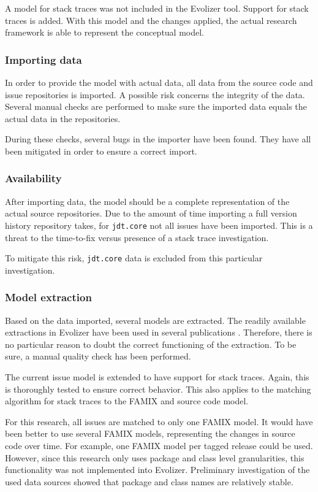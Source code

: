A model for stack traces was not included in the Evolizer tool. Support for stack traces is added. With this model and the changes applied, the actual research framework is able to represent the conceptual model.

\subsubsection{Importing data} %
In order to provide the model with actual data, all data from the source code and issue repositories is imported. A possible risk concerns the integrity of the data. Several manual checks are performed to make sure the imported data equals the actual data in the repositories.

During these checks, several bugs in the importer have been found. They have all been mitigated in order to ensure a correct import. 

\subsubsection{Availability} %
After importing data, the model should be a complete representation of the actual source repositories. Due to the amount of time importing a full version history repository takes, for \texttt{jdt.core} not all issues have been imported. This is a threat to the time-to-fix versus presence of a stack trace investigation. 

To mitigate this risk, \texttt{jdt.core} data is excluded from this particular investigation.

\subsubsection{Model extraction} %
Based on the data imported, several models are extracted. The readily available extractions in Evolizer have been used in several publications \cite{Gall2009,Ghezzi2008,Ghezzi2010}. Therefore, there is no particular reason to doubt the correct functioning of the extraction. To be sure, a manual quality check has been performed.

The current issue model is extended to have support for stack traces. Again, this is thoroughly tested to ensure correct behavior. This also applies to the matching algorithm for stack traces to the FAMIX and source code model.

For this research, all issues are matched to only one FAMIX model. It would have been better to use several FAMIX models, representing the changes in source code over time. For example, one FAMIX model per tagged release could be used. However, since this research only uses package and class level granularities, this functionality was not implemented into Evolizer. Preliminary investigation of the used data sources showed that package and class names are relatively stable.

